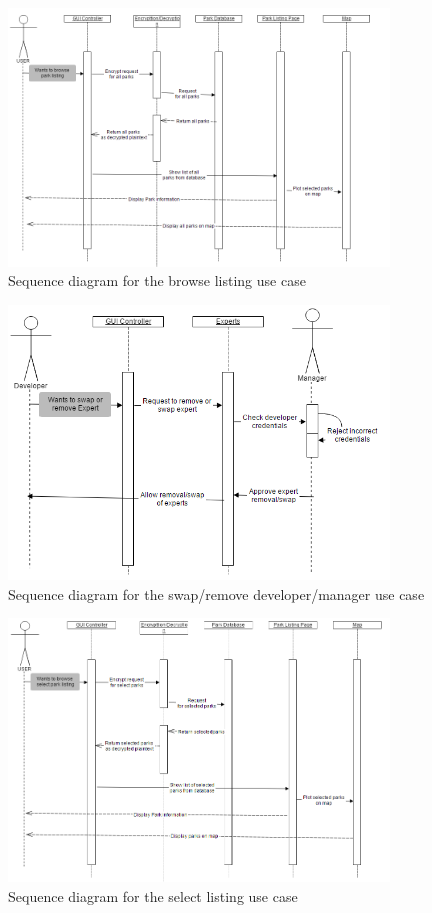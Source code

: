 \documentclass[titlepage,12pt]{article}
\begin{document}
\begin{figure}[H]
	\centerline{\includegraphics[width=0.90\textwidth]{sequence_diagrams/BrowseListing}}
	\caption{Sequence diagram for the browse listing use case}
	\label{fig:SD2}
\end{figure}
\begin{figure}[H]
	\centerline{\includegraphics[width=0.90\textwidth]{sequence_diagrams/SwapRemoveExperts}}
	\caption{Sequence diagram for the swap/remove developer/manager use case}
	\label{fig:SD4}
\end{figure}

\begin{figure}[H]
	\centerline{\includegraphics[width=0.90\textwidth]{sequence_diagrams/SelectedListing}}
	\caption{Sequence diagram for the select listing use case}
	\label{fig:SD3}
\end{figure}
\end{document}
